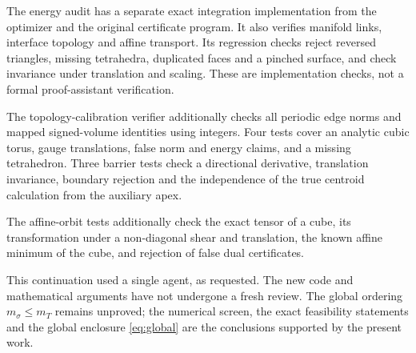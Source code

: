 \documentclass[11pt,a4paper]{report}
\begin{document}
The energy audit has a separate exact integration implementation from the
optimizer and the original certificate program. It also verifies manifold
links, interface topology and affine transport. Its regression checks
reject reversed triangles, missing tetrahedra, duplicated faces and a
pinched surface, and check invariance under translation and scaling.
These are implementation checks, not a formal proof-assistant verification.

The topology-calibration verifier additionally checks all periodic edge
norms and mapped signed-volume identities using integers. Four tests cover
an analytic cubic torus, gauge translations, false norm and energy claims,
and a missing tetrahedron. Three barrier tests check a directional derivative,
translation invariance, boundary rejection and the independence of the true
centroid calculation from the auxiliary apex.

The affine-orbit tests additionally check the exact tensor of a cube,
its transformation under a non-diagonal shear and translation, the known
affine minimum of the cube, and rejection of false dual certificates.

This continuation used a single agent, as requested. The new code and
mathematical arguments have not undergone a fresh review.
The global ordering $m_\sigma\leq m_T$ remains unproved; the numerical
screen, the exact feasibility statements and the global enclosure
\eqref{eq:global} are the conclusions supported by the present work.

\clearpage
\paperreferences
\end{document}
